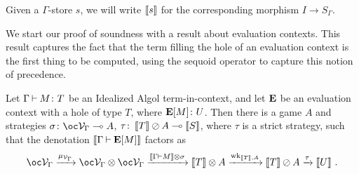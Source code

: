\documentclass[11pt]{report}
\begin{document}
Given a $\Gamma$-store $s$, we will write $\left\llbracket s\right\rrbracket$ for the corresponding morphism $I \to S_\Gamma$.

We start our proof of soundness with a result about evaluation contexts.
This result captures the fact that the term filling the hole of an evaluation context is the first thing to be computed, using the sequoid operator to capture this notion of precedence.
\begin{lemma}
  Let $\Gamma\mathbin{\vdash} M\colon T$ be an Idealized Algol term-in-context, and let ${\mathbf{E}}$ be an evaluation context with a hole of type $T$, where ${\mathbf{E}}[M]\colon U$.  
  Then there is a game $A$ and strategies $\sigma\from \oc\V_\Gamma \implies A$, $\tau\colon\left\llbracket T\right\rrbracket\oslash A \multimap \left\llbracket S\right\rrbracket$, where $\tau$ is a strict strategy, such that the denotation $\left\llbracket\Gamma\mathbin{\vdash}{\mathbf{E}}[M]\right\rrbracket$ factors as
  \[
    \oc\V_\Gamma \xrightarrow{\mu_{\V_\Gamma}} \oc \V_\Gamma \tensor \oc \V_\Gamma \xrightarrow{\deno{\Gamma\ts M}\tensor\sigma} \deno{T}\tensor A \xrightarrow{\wk_{\deno{T},A}} \deno{T} \sequoid A \xrightarrow{\tau} \deno{U}\,.
    \]
  \label{LemEvContexLemma}
\end{lemma}
\end{document}
